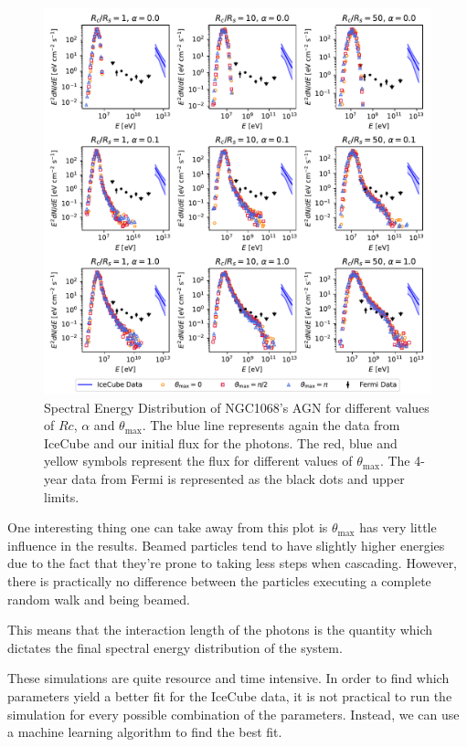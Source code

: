 \begin{figure}[H]
    \includegraphics[width=\textwidth]{Figures/simulations_plot.pdf}
    \centering
    \caption{Spectral Energy Distribution of NGC1068's AGN for different values of $Rc$, $\alpha$ and $\theta_{\max}$. The blue line represents again the data from IceCube and our initial flux for the photons. The red, blue and yellow symbols represent the flux for different values of $\theta_{\max}$. The 4-year data from Fermi is represented as the black dots and upper limits.}
    \label{fig:simulations}
\end{figure}

One interesting thing one can take away from this plot is $\theta_{\max}$ has very little influence in the results. Beamed particles tend to have slightly higher energies due to the fact that they're prone to taking less steps when cascading. However, there is practically no difference between the particles executing a complete random walk and being beamed.

This means that the interaction length of the photons is the quantity which dictates the final spectral energy distribution of the system. 

These simulations are quite resource and time intensive. In order to find which parameters yield a better fit for the IceCube data, it is not practical to run the simulation for every possible combination of the parameters. Instead, we can use a machine learning algorithm to find the best fit.

